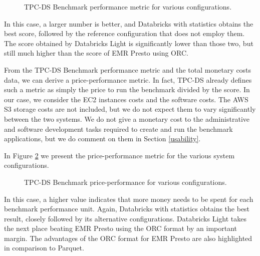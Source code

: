 \begin{figure}
   \begin{center}
   \end{center}
   \caption{TPC-DS Benchmark performance metric for various configurations.}
   \label{fig:performanceMetricResults}
\end{figure}

In this case, a larger number is better, and Databricks with statistics obtains the best score, followed by the reference configuration that does not employ them. The score obtained by Databricks Light is significantly lower than those two, but still much higher than the score of EMR Presto using ORC.

From the TPC-DS Benchmark performance metric and the total monetary costs data, we can derive a price-performance metric. In fact, TPC-DS already defines such a metric as simply the price to run the benchmark divided by the score. In our case, we consider the EC2 instances costs and the software costs. The AWS S3 storage costs are not included, but we do not expect them to vary significantly between the two systems. We do not give a monetary cost to the administrative and software development tasks required to create and run the benchmark applications, but we do comment on them in Section \ref{usability}.

In Figure \ref{fig:pricePerformanceResults} we present the price-performance metric for the various system configurations.

\begin{figure}
   \begin{center}
   \end{center}
   \caption{TPC-DS Benchmark price-performance for various configurations.}
   \label{fig:pricePerformanceResults}
\end{figure}

In this case, a higher value indicates that more money needs to be spent for each benchmark performance unit. Again, Databricks with statistics obtains the best result, closely followed by its alternative configurations. Databricks Light takes the next place beating EMR Presto using the ORC format by an important margin. The advantages of the ORC format for EMR Presto are also highlighted in comparison to Parquet.




